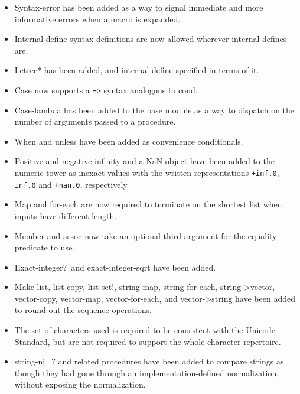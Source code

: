 \begin{itemize}
\item {\cf Syntax-error} has been added as a way to signal immediate
and more informative errors when a macro is expanded.

\item Internal {\cf define-syntax} definitions are now allowed wherever
internal {\cf define}s are.

\item {\cf Letrec*} has been added, and internal define specified in
terms of it.

\item {\cf Case} now supports a {\tt =>} syntax analogous to {\cf cond}.

\item {\cf Case-lambda} has been added to the base module as a way to
dispatch on the number of arguments passed to a procedure.

\item {\cf When} and {\cf unless} have been added as convenience
conditionals.

\item Positive and negative infinity and a NaN object have been added
to the numeric tower as inexact values with the written
representations {\tt +inf.0}, {\tt -inf.0} and {\tt +nan.0},
respectively.

\item {\cf Map} and {\cf for-each} are now required to terminate on
the shortest list when inputs have different length.

\item {\cf Member} and {\cf assoc} now take an optional third argument
for the equality predicate to use.

\item {\cf Exact-integer?}\  and {\cf exact-integer-sqrt} have been added.

\item {\cf Make-list}, {\cf list-copy}, {\cf list-set!}, {\cf
string-map}, {\cf string-for-each}, {\cf string->vector}, {\cf
vector-copy}, {\cf vector-map}, {\cf vector-for-each}, and {\cf
vector->string} have been added to round out the sequence operations.

\item The set of characters used is required to be consistent with the
Unicode Standard, 
but are not required to support the whole character repertoire.

\item {\cf string-ni=?} and related procedures have been added to
compare strings as though they had gone through an
implementation-defined normalization, without exposing the
normalization.


\end{itemize}
